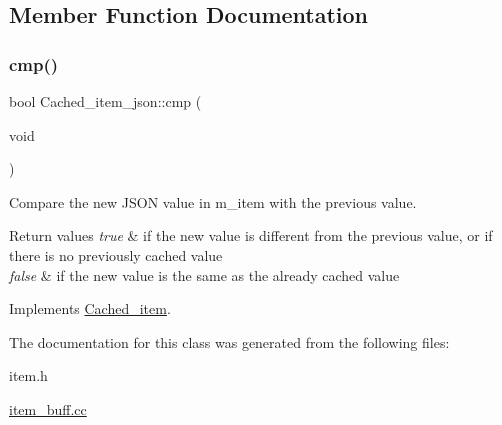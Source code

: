 \subsection{Member Function Documentation}
\mbox{\label{classCached__item__json_a5f0c852aa12e5f2072ddf5b683f2995d}} 
\subsubsection{\texorpdfstring{cmp()}{cmp()}}
{\footnotesize\ttfamily bool Cached\+\_\+item\+\_\+json\+::cmp (\begin{DoxyParamCaption}\item[{void}]{ }\end{DoxyParamCaption})\hspace{0.3cm}{\ttfamily [virtual]}}

Compare the new J\+S\+ON value in m\+\_\+item with the previous value. 
\begin{DoxyRetVals}{Return values}
{\em true} & if the new value is different from the previous value, or if there is no previously cached value \\
\hline
{\em false} & if the new value is the same as the already cached value \\
\hline
\end{DoxyRetVals}


Implements \mbox{\hyperlink{classCached__item}{Cached\+\_\+item}}.



The documentation for this class was generated from the following files\+:\begin{DoxyCompactItemize}
\item 
item.\+h\item 
\mbox{\hyperlink{item__buff_8cc}{item\+\_\+buff.\+cc}}\end{DoxyCompactItemize}
